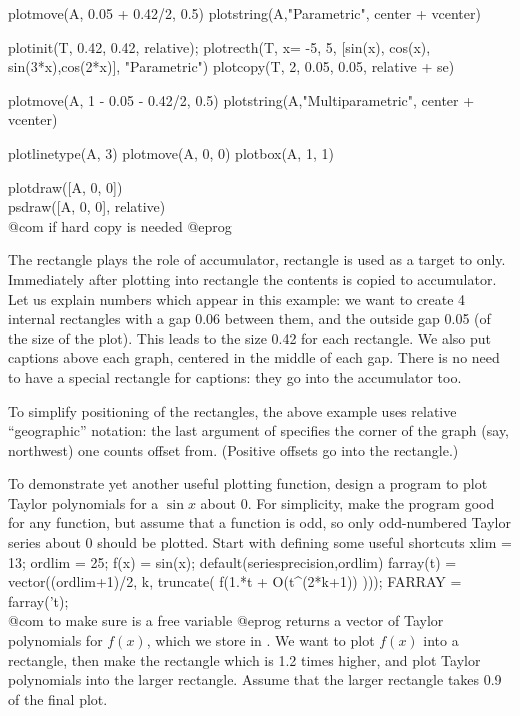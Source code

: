   plotmove(A, 0.05 + 0.42/2, 0.5)
  plotstring(A,"Parametric", center + vcenter)

  plotinit(T, 0.42, 0.42, relative);
  plotrecth(T, x= -5, 5, [sin(x), cos(x), sin(3*x),cos(2*x)], "Parametric")
  plotcopy(T, 2, 0.05, 0.05, relative + se)

  plotmove(A, 1 - 0.05 - 0.42/2, 0.5)
  plotstring(A,"Multiparametric", center + vcenter)

  plotlinetype(A, 3)
  plotmove(A, 0, 0)
  plotbox(A, 1, 1)

  plotdraw([A, 0, 0])
  \\ psdraw([A, 0, 0], relative)          \\ @com if hard copy is needed
@eprog

The rectangle  plays the role of accumulator, rectangle  is
used as a target to  only.  Immediately after plotting into
rectangle  the contents is copied to accumulator.  Let us explain
numbers which appear in this example: we want to create 4 internal rectangles
with a gap 0.06 between them, and the outside gap 0.05 (of the size of the
plot).  This leads to the size 0.42 for each rectangle.  We also
put captions above each graph, centered in the middle of each gap.  There
is no need to have a special rectangle for captions: they go into the
accumulator too.

To simplify positioning of the rectangles, the above example uses relative
``geographic'' notation: the last argument of  specifies the
corner of the graph (say, northwest) one counts offset from. (Positive
offsets go into the rectangle.)

To demonstrate yet another useful plotting function, design a program to
plot Taylor polynomials for a $\sin x$ about 0.  For simplicity, make the
program good for any function, but assume that a function is odd, so only
odd-numbered Taylor series about 0 should be plotted.  Start with defining
some useful shortcuts
\bprog
  xlim = 13;  ordlim = 25;  f(x) = sin(x);
  default(seriesprecision,ordlim)
  farray(t) = vector((ordlim+1)/2, k, truncate( f(1.*t + O(t^(2*k+1)) )));
  FARRAY = farray('t);  \\@com{} to make sure  is a free variable
@eprog\noindent
{} returns a vector of Taylor polynomials for $f(x)$, which we
store in .  We want to plot $f(x)$ into a rectangle, then make
the rectangle which is 1.2 times higher, and plot Taylor polynomials into the
larger rectangle.  Assume that the larger rectangle takes 0.9 of the final
plot.

